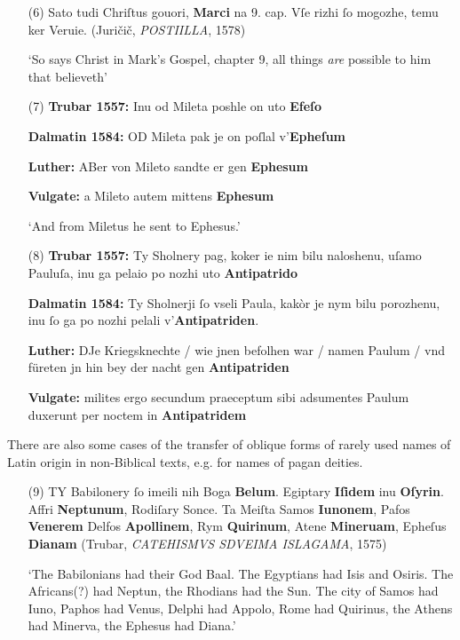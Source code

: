 \documentclass[output=paper,colorlinks,citecolor=brown,arabicfont,chinesefont]{langscibook}
\begin{document}
\begin{itemize}
    \item[(6)] Sato tudi Chriſtus gouori, \textbf{Marci} na 9. cap. Vſe rizhi ſo mogozhe, temu ker Veruie. (Juričič, \emph{POSTIILLA},  1578)
    
    ‘So says Christ in Mark’s Gospel, chapter 9,  all things \emph{are} possible to him that believeth’
    \item[(7)] \textbf{Trubar 1557:} Inu od Mileta poshle on uto \textbf{Efeſo}

    \textbf{Dalmatin 1584:} OD Mileta pak je on poſlal v'\textbf{Epheſum}

    \textbf{Luther:} ABer von Mileto sandte er gen \textbf{Ephesum}

    \textbf{Vulgate:} a Mileto autem mittens \textbf{Ephesum}
    
    ‘And from Miletus he sent to Ephesus.’

    \item[(8)] \textbf{Trubar 1557:} Ty Sholnery pag, koker ie nim bilu naloshenu, uſamo Pauluſa, inu ga pelaio po nozhi uto \textbf{Antipatrido}
    
    \textbf{Dalmatin 1584:} Ty Sholnerji ſo vseli Paula, kakòr je nym bilu porozhenu, inu ſo ga po nozhi pelali v'\textbf{Antipatriden}.
    
    \textbf{Luther:} DJe Kriegsknechte / wie jnen befolhen war / namen Paulum / vnd füreten jn hin bey der nacht gen \textbf{Antipatriden}
    
    \textbf{Vulgate:} milites ergo secundum praeceptum sibi adsumentes Paulum duxerunt per noctem in \textbf{Antipatridem}
\end{itemize}

There are also some cases of the transfer of oblique forms of rarely used names of Latin origin in non-Biblical texts, e.g. for names of pagan deities. 

\begin{itemize}
    \item[(9)] TY Babilonery ſo imeili nih Boga \textbf{Belum}. Egiptary \textbf{Iſidem} inu \textbf{Oſyrin}. Affri \textbf{Neptunum}, Rodiſary Sonce. Ta Meiſta Samos \textbf{Iunonem}, Pafos \textbf{Venerem} Delfos \textbf{Apollinem}, Rym \textbf{Quirinum}, Atene \textbf{Mineruam}, Epheſus \textbf{Dianam} (Trubar, \emph{CATEHISMVS SDVEIMA ISLAGAMA}, 1575)
    
    ‘The Babilonians had their God Baal. The Egyptians had Isis and Osiris. The Africans(?) had Neptun, the Rhodians had the Sun. The city of Samos had Iuno, Paphos had Venus, Delphi had Appolo, Rome had Quirinus, the Athens had Minerva, the Ephesus had Diana.’

\end{itemize}
\end{document}
